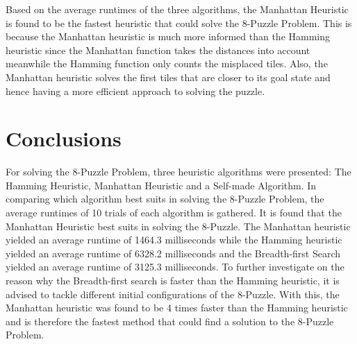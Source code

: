 	Based on the average runtimes of the three algorithms, the Manhattan Heuristic is found to be the fastest heuristic that could solve the 8-Puzzle Problem. This is because the Manhattan heuristic is much more informed than the Hamming heuristic since the Manhattan function takes the distances into account meanwhile the Hamming function only counts the misplaced tiles. Also, the Manhattan heuristic solves the first tiles that are closer to its goal state and hence having a more efficient approach to solving the puzzle.

\section{Conclusions}
	For solving the 8-Puzzle Problem, three heuristic algorithms were presented: The Hamming Heuristic, Manhattan Heuristic and a Self-made Algorithm. In comparing which algorithm best suits in solving the 8-Puzzle Problem, the average runtimes of 10 trials of each algorithm is gathered. It is found that the Manhattan Heuristic best suits in solving the 8-Puzzle. The Manhattan heuristic yielded an average runtime of 1464.3 milliseconds while the Hamming heuristic yielded an average runtime of 6328.2 milliseconds and the Breadth-first Search yielded an average runtime of 3125.3 milliseconds. To further investigate on the reason why the Breadth-first search is faster than the Hamming heuristic, it is advised to tackle different initial configurations of the 8-Puzzle. With this, the Manhattan heuristic was found to be 4 times faster than the Hamming heuristic and is therefore the fastest method that could find a solution to the 8-Puzzle Problem.